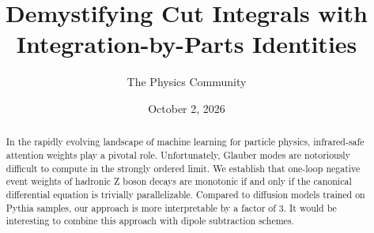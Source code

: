 \documentclass[11pt]{article}
\title{Demystifying Cut Integrals with Integration-by-Parts Identities}
\author{The Physics Community}
\date{October 2, 2026}
\numberwithin{equation}{section}
\theoremstyle{definition}
\theoremstyle{remark}
\begin{document}
\maketitle
\begin{abstract}
In the rapidly evolving landscape of machine learning for particle
physics, infrared-safe attention weights play a pivotal role.
Unfortunately, Glauber modes are notoriously difficult to compute in the
strongly ordered limit. We establish that one-loop negative event
weights of hadronic Z boson decays are monotonic if and only if the
canonical differential equation is trivially parallelizable. Compared to
diffusion models trained on Pythia samples, our approach is more
interpretable by a factor of 3. It would be interesting to combine this
approach with dipole subtraction schemes.
\end{abstract}
\tableofcontents





\nocite{*}


\end{document}
